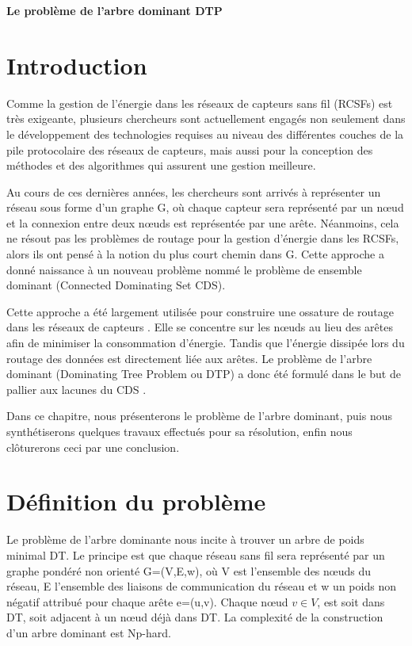 \cleardoublepage


\setcounter{chapter}{3}
\setcounter{section}{0}
\setcounter{figure}{0}

\begin{center}
	\Huge\textbf{ Le problème de l’arbre dominant DTP }
\end{center}

\section{Introduction}
Comme la gestion de l’énergie dans les réseaux de capteurs sans fil (RCSFs) est très exigeante, plusieurs chercheurs sont actuellement engagés non seulement dans le développement des technologies requises au niveau des différentes couches de la pile protocolaire des réseaux de capteurs, mais aussi pour la conception des méthodes et des algorithmes qui assurent une gestion meilleure.

Au cours de ces dernières années, les chercheurs sont arrivés à représenter un réseau sous forme d’un graphe G, où chaque capteur sera représenté par un nœud et la connexion entre deux nœuds est représentée par une arête. Néanmoins, cela ne résout pas  les problèmes de routage pour la gestion d’énergie dans les RCSFs, alors ils ont pensé à la notion du plus court chemin dans G.  Cette approche a donné naissance à un nouveau problème nommé le problème de ensemble dominant (Connected Dominating Set CDS).

Cette approche a été largement utilisée pour construire une ossature de routage dans les réseaux de capteurs \cite{thai2008construction,thai2007connected}. Elle se concentre sur les nœuds au lieu des arêtes afin de minimiser la consommation d’énergie. Tandis que l’énergie dissipée lors du routage des données est directement liée aux arêtes.
Le problème de l’arbre dominant (Dominating Tree Problem ou DTP) a donc été formulé dans le but de pallier aux lacunes du CDS \cite{shin2010approximation,zhang2008new} .

Dans ce chapitre, nous présenterons le problème de l’arbre dominant, puis nous synthétiserons quelques travaux effectués pour sa résolution, enfin nous clôturerons ceci par une conclusion.


\section{Définition du problème}
Le problème de l’arbre dominante nous incite à trouver un arbre de poids minimal DT. Le principe est que chaque réseau sans fil sera représenté par un graphe pondéré non orienté G=(V,E,w), où V est l’ensemble des nœuds du réseau, E l’ensemble des liaisons de communication du réseau et w un poids non négatif attribué pour chaque arête e=(u,v). Chaque nœud $v \in V$, est soit dans DT, soit adjacent à un nœud déjà dans DT. La complexité de la construction d’un arbre dominant est Np-hard.
 
